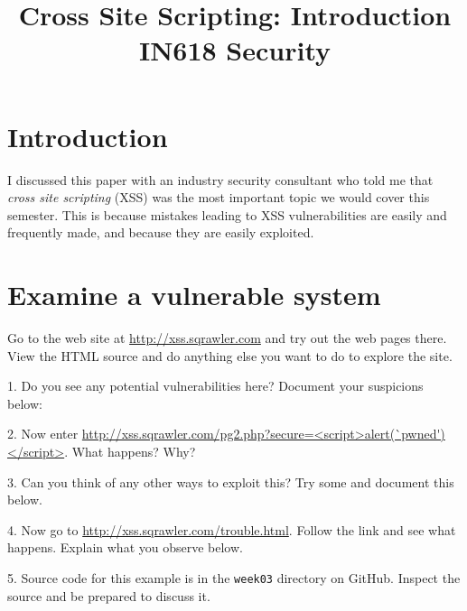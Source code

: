\documentclass{article}
\begin{document}
\title{Cross Site Scripting: Introduction\\ IN618 Security}
\date{}
\maketitle

\section*{Introduction}
I discussed this paper with an industry security consultant who told me that 
\emph{cross site scripting} (XSS) was the most important topic we would cover this 
semester. This is because mistakes leading to XSS vulnerabilities are easily
and frequently made, and because they are easily exploited. 

\section*{Examine a vulnerable system}
Go to the web site at \url{http://xss.sqrawler.com} and try out the web 
pages there.  View the HTML source and do anything else you want to 
do to explore the site.

1. Do you see any potential vulnerabilities here?  Document your
suspicions below:

\vspace{60mm}

2. Now enter \url{http://xss.sqrawler.com/pg2.php?secure=<script>alert(`pwned')</script>}.  What happens?  Why?

\vspace{60mm}

3. Can you think of any other ways to exploit this?  Try some and 
document this below.

\vspace{60mm}



4. Now go to \url{http://xss.sqrawler.com/trouble.html}.  Follow the 
link and see what happens.  Explain what you observe below.

\vspace{90mm}

5. Source code for this example is in the \texttt{week03} directory on GitHub.
Inspect the source and be prepared to discuss it.
\end{document}
